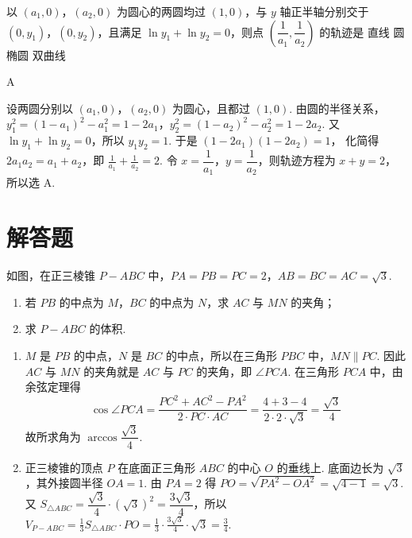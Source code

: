 \begin{problem}
以 \((a_1,0)\)，\((a_2,0)\) 为圆心的两圆均过 \((1,0)\)，与 \(y\) 轴正半轴分别交于 \((0,y_1)\)，\((0,y_2)\)，且满足 \(\ln y_1+\ln y_2=0\)，则点 \(\left(\dfrac1{a_1},\dfrac1{a_2}\right)\) 的轨迹是
\choices
    {直线}
    {圆}
    {椭圆}
    {双曲线}
\end{problem}

\begin{answer}
A
\end{answer}

\begin{solution}
设两圆分别以 \((a_1,0)\)，\((a_2,0)\) 为圆心，且都过 \((1,0)\). 由圆的半径关系，
\(y_1^2=(1-a_1)^2-a_1^2=1-2a_1\)，\(y_2^2=(1-a_2)^2-a_2^2=1-2a_2\).
又 \(\ln y_1+\ln y_2=0\)，所以 \(y_1y_2=1\). 于是
\((1-2a_1)(1-2a_2)=1\)，
化简得 \(2a_1a_2=a_1+a_2\)，即
\(\frac1{a_1}+\frac1{a_2}=2\).
令 \(x=\dfrac1{a_1}\)，\(y=\dfrac1{a_2}\)，则轨迹方程为 \(x+y=2\)，所以选 A.
\end{solution}
\section{解答题}

\begin{problem}
如图，在正三棱锥 \(P-ABC\) 中，\(PA=PB=PC=2\)，\(AB=BC=AC=\sqrt3\).

\begin{enumerate}
\item 若 \(PB\) 的中点为 \(M\)，\(BC\) 的中点为 \(N\)，求 \(AC\) 与 \(MN\) 的夹角；
\item 求 \(P-ABC\) 的体积.
\end{enumerate}

\end{problem}

\begin{solution}
\begin{enumerate}
\item \(M\) 是 \(PB\) 的中点，\(N\) 是 \(BC\) 的中点，所以在三角形 \(PBC\) 中，\(MN\parallel PC\). 因此 \(AC\) 与 \(MN\) 的夹角就是 \(AC\) 与 \(PC\) 的夹角，即 \(\angle PCA\).
在三角形 \(PCA\) 中，由余弦定理得
\[
\cos\angle PCA=\frac{PC^2+AC^2-PA^2}{2\cdot PC\cdot AC}
=\frac{4+3-4}{2\cdot2\cdot\sqrt3}
=\frac{\sqrt3}{4}
\]
故所求角为 \(\arccos\dfrac{\sqrt3}{4}\).

\item 正三棱锥的顶点 \(P\) 在底面正三角形 \(ABC\) 的中心 \(O\) 的垂线上. 底面边长为 \(\sqrt3\)，其外接圆半径 \(OA=1\). 由 \(PA=2\) 得
\(PO=\sqrt{PA^2-OA^2}=\sqrt{4-1}=\sqrt3\).
又 \(S_{\triangle ABC}=\dfrac{\sqrt3}{4}\cdot(\sqrt3)^2=\dfrac{3\sqrt3}{4}\)，所以 \(V_{P-ABC}=\frac13 S_{\triangle ABC}\cdot PO=\frac13\cdot\frac{3\sqrt3}{4}\cdot\sqrt3=\frac34\).
\end{enumerate}
\end{solution}

